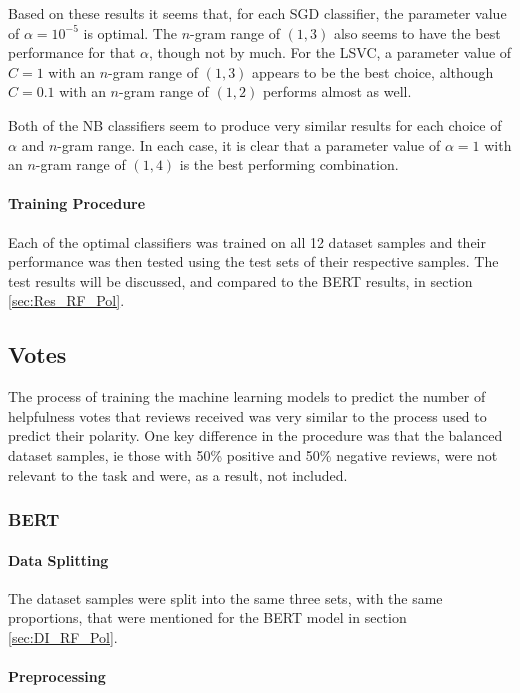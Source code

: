 Based on these results it seems that, for each SGD classifier, the parameter value of $\alpha=10^{-5}$ is optimal. The $n$-gram range of $(1, 3)$ also seems to have the best performance for that $\alpha$, though not by much. For the LSVC, a parameter value of $C=1$ with an $n$-gram range of $(1, 3)$ appears to be the best choice, although $C=0.1$ with an $n$-gram range of $(1, 2)$ performs almost as well.

Both of the NB classifiers seem to produce very similar results for each choice of $\alpha$ and $n$-gram range. In each case, it is clear that a parameter value of $\alpha=1$ with an $n$-gram range of $(1,4)$ is the best performing combination.

\paragraph{Training Procedure}

Each of the optimal classifiers was trained on all 12 dataset samples and their performance was then tested using the test sets of their respective samples. The test results will be discussed, and compared to the BERT results, in section \ref{sec:Res_RF_Pol}.

\subsection{Votes} \label{sec:DI_RF_Votes}

The process of training the machine learning models to predict the number of helpfulness votes that reviews received was very similar to the process used to predict their polarity. One key difference in the procedure was that the balanced dataset samples, ie those with 50\% positive and 50\% negative reviews, were not relevant to the task and were, as a result, not included.

\subsubsection{BERT}

\paragraph{Data Splitting}

The dataset samples were split into the same three sets, with the same proportions, that were mentioned for the BERT model in section \ref{sec:DI_RF_Pol}.

\paragraph{Preprocessing}

